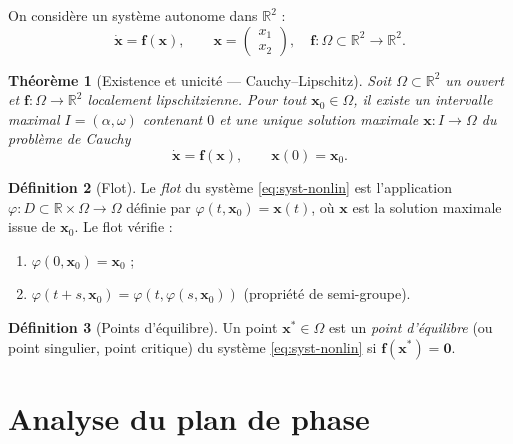 \documentclass[12pt,a4paper,openany]{book}
\theoremstyle{definition}
\newtheorem{definition}{Définition}[chapter]
\theoremstyle{plain}
\newtheorem{theoreme}[definition]{Théorème}
\theoremstyle{remark}
\newcommand{\R}{\mathbb{R}}
\begin{document}
On considère un système autonome dans $\R^2$ :
\begin{equation}
\label{eq:syst-nonlin}
\dot{\mathbf{x}} = \mathbf{f}(\mathbf{x}),
\qquad \mathbf{x} = \begin{pmatrix} x_1 \\ x_2 \end{pmatrix},
\quad \mathbf{f} : \Omega \subset \R^2 \to \R^2.
\end{equation}

\begin{theoreme}[Existence et unicité --- Cauchy--Lipschitz]
\label{thm:cauchy-lip-nonlin}
Soit $\Omega \subset \R^2$ un ouvert et
$\mathbf{f} : \Omega \to \R^2$ localement lipschitzienne.
Pour tout $\mathbf{x}_0 \in \Omega$, il existe un intervalle maximal
$I = (\alpha, \omega)$ contenant $0$ et une unique solution maximale
$\mathbf{x} : I \to \Omega$ du problème de Cauchy
\[
\dot{\mathbf{x}} = \mathbf{f}(\mathbf{x}), \qquad
\mathbf{x}(0) = \mathbf{x}_0.
\]
\end{theoreme}

\begin{definition}[Flot]
\label{def:flot}
Le \emph{flot} du système \eqref{eq:syst-nonlin} est l'application
$\varphi : D \subset \R \times \Omega \to \Omega$ définie par
$\varphi(t, \mathbf{x}_0) = \mathbf{x}(t)$, où $\mathbf{x}$ est
la solution maximale issue de $\mathbf{x}_0$. Le flot vérifie :
\begin{enumerate}[label=(\roman*)]
  \item $\varphi(0, \mathbf{x}_0) = \mathbf{x}_0$ ;
  \item $\varphi(t+s, \mathbf{x}_0) = \varphi(t, \varphi(s, \mathbf{x}_0))$
        (propriété de semi-groupe).
\end{enumerate}
\end{definition}

\begin{definition}[Points d'équilibre]
\label{def:pts-equil}
Un point $\mathbf{x}^* \in \Omega$ est un \emph{point d'équilibre}
(ou point singulier, point critique) du système \eqref{eq:syst-nonlin}
si $\mathbf{f}(\mathbf{x}^*) = \mathbf{0}$.
\end{definition}

\section{Analyse du plan de phase}
\label{sec:plan-phase}
\end{document}
